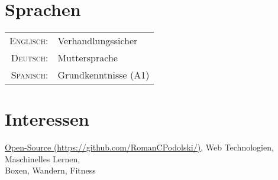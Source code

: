 \documentclass[a4paper,10pt]{article} %
\begin{document}
 
 
 
 
 
\section{Sprachen}
 
\begin{tabular}{rl}
\textsc{Englisch:} & Verhandlungssicher\\
 
\textsc{Deutsch:} & Muttersprache\\
 
  \textsc{Spanisch:} & Grundkenntnisse (A1)\\
\end{tabular}
 
 
 
\section{Interessen}
 
\href{https://github.com/RomanCPodolski}{Open-Source (\faGithub https://github.com/RomanCPodolski/)}, Web Technologien, Maschinelles Lernen, \\
Boxen, Wandern, Fitness
 
 
\newpage
 
\end{document}
